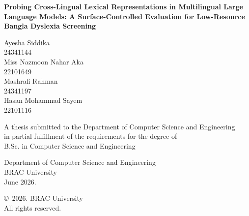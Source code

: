 \begin{titlepage}
\renewcommand*{\thepage}{Title}

    \begin{center}
        \vspace*{2cm}

        {\fontsize{18pt}{24pt}\selectfont\textbf{Probing Cross-Lingual Lexical Representations in Multilingual Large Language Models: A Surface-Controlled Evaluation for Low-Resource Bangla Dyslexia Screening}}

        \vspace{1.5cm}


        \vspace{0.5cm}

            Ayesha Siddika\\
            24341144\\
            Miss Nazmoon Nahar Aka\\
            22101649\\
            Mashrafi Rahman\\
            24341197\\
            Hasan Mohammad Sayem\\
            22101116

        \vspace{1.5cm}

            A thesis submitted to the Department of Computer Science and Engineering\\
            in partial fulfillment of the requirements for the degree of\\
            B.Sc. in Computer Science and Engineering

        \vspace{2.5cm}

            Department of Computer Science and Engineering\\
            BRAC University\\
            June 2026.

        \vspace{3cm}

            \copyright\ 2026. BRAC University\\
            All rights reserved.

    \end{center}

\end{titlepage}